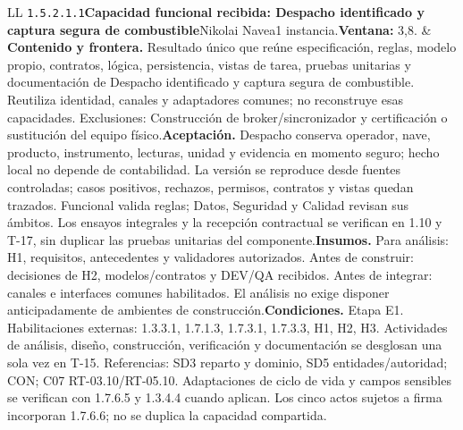 \begin{longtable}{L{\tabcolsep\relax}L{\tabcolsep\relax}}
\texttt{1.\allowbreak{}5.\allowbreak{}2.\allowbreak{}1.\allowbreak{}1}\newline{}\textbf{Capacidad funcional recibida: Despacho identificado y captura segura de combustible}\newline{}Nikolai Navea\newline{}1 instancia.\newline{}\textbf{Ventana:} 3,8. & \textbf{Contenido y frontera.} Resultado único que reúne especificación, reglas, modelo propio, contratos, lógica, persistencia, vistas de tarea, pruebas unitarias y documentación de Despacho identificado y captura segura de combustible. Reutiliza identidad, canales y adaptadores comunes; no reconstruye esas capacidades. Exclusiones: Construcción de broker/sincronizador y certificación o sustitución del equipo físico.\newline{}\textbf{Aceptación.} Despacho conserva operador, nave, producto, instrumento, lecturas, unidad y evidencia en momento seguro; hecho local no depende de contabilidad. La versión se reproduce desde fuentes controladas; casos positivos, rechazos, permisos, contratos y vistas quedan trazados. Funcional valida reglas; Datos, Seguridad y Calidad revisan sus ámbitos. Los ensayos integrales y la recepción contractual se verifican en 1.10 y T-17, sin duplicar las pruebas unitarias del componente.\newline{}\textbf{Insumos.} Para análisis: H1, requisitos, antecedentes y validadores autorizados. Antes de construir: decisiones de H2, modelos/contratos y DEV/QA recibidos. Antes de integrar: canales e interfaces comunes habilitados. El análisis no exige disponer anticipadamente de ambientes de construcción.\newline{}\textbf{Condiciones.} Etapa E1. Habilitaciones externas: 1.3.3.1, 1.7.1.3, 1.7.3.1, 1.7.3.3, H1, H2, H3. Actividades de análisis, diseño, construcción, verificación y documentación se desglosan una sola vez en T-15. Referencias: SD3 reparto y dominio, SD5 entidades/autoridad; CON; C07 RT-03.10/RT-05.10. Adaptaciones de ciclo de vida y campos sensibles se verifican con 1.7.6.5 y 1.3.4.4 cuando aplican. Los cinco actos sujetos a firma incorporan 1.7.6.6; no se duplica la capacidad compartida.\\\hline

\end{longtable}

